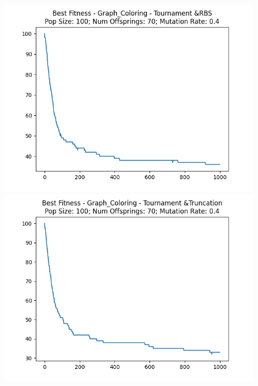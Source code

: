\documentclass[12pt]{report}
\theoremstyle{mytheoremstyle}
\theoremstyle{mytheoremstyle}
\theoremstyle{myproblemstyle}
\begin{document}
\begin{figure}[!]
\begin{minipage}{0.4\textwidth}
		\includegraphics[width=\linewidth]{../Analysis/BSF_Graph_Coloring_2_1_100_70.png}
	\end{minipage}
	\hspace{\fill}
	\begin{minipage}{0.4\textwidth}
		\includegraphics[width=\linewidth]{../Analysis/BSF_Graph_Coloring_2_3_100_70.png}
	\end{minipage}
	\vspace*{1cm}
	\begin{minipage}{0.4\textwidth}

\end{minipage}
\end{figure}
\end{document}
